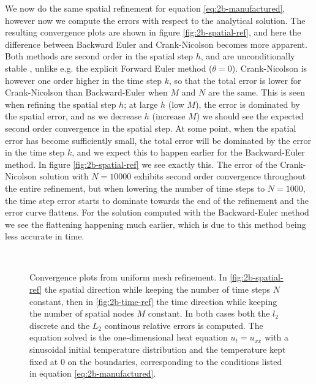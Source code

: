 We now do the same spatial refinement for equation \eqref{eq:2b-manufactured}, 
however now we compute the errors with respect to the analytical solution. 
The resulting convergence plots are shown in figure \ref{fig:2b-spatial-ref}, 
and here the difference between Backward Euler and Crank-Nicolson becomes more apparent. 
Both methods are second order in the spatial step $h$, 
and are unconditionally stable \cite{find some source probably brynjulf}, 
unlike e.g. the explicit Forward Euler method ($\theta=0$). 
Crank-Nicolson is however one order higher in the time step $k$, 
so that the total error is lower for Crank-Nicolson than Backward-Euler when $M$ and $N$ are the same. 
This is seen when refining the spatial step $h$; 
at large $h$ (low $M$), 
the error is dominated by the spatial error, 
and as we decrease $h$ (increase $M$) we should see the expected second order convergence in the spatial step. 
At some point, 
when the spatial error has become sufficiently small, 
the total error will be dominated by the error in the time step $k$, 
and we expect this to happen earlier for the Backward-Euler method. 
In figure \ref{fig:2b-spatial-ref} we see exactly this. 
The error of the Crank-Nicolson solution with $N=10000$ exhibits second order convergence throughout the entire refinement, 
but when lowering the number of time steps to $N=1000$, 
the time step error starts to dominate towards the end of the refinement and the error curve flattens. 
For the solution computed with the Backward-Euler method we see the flattening happening much earlier, 
which is due to this method being less accurate in time. 
\begin{figure}
    \centering
    \label{fig:2b-spatial-temporal-ref}
     \\ \medskip
    \caption{
        Convergence plots from uniform mesh refinement. 
        In \ref{fig:2b-spatial-ref} the spatial direction while keeping the number of time steps $N$ constant, 
        then in \ref{fig:2b-time-ref} the time direction while keeping the number of spatial nodes $M$ constant. 
        In both cases 
        both the $l_2$ discrete and the $L_2$ continous relative errors is computed. 
        The equation solved is the one-dimensional heat equation $u_t=u_{xx}$ 
        with a sinusoidal initial temperature distribution and the temperature kept fixed at $0$ 
        on the boundaries, 
        corresponding to the conditions listed in equation \eqref{eq:2b-manufactured}. 
    }
\end{figure}

